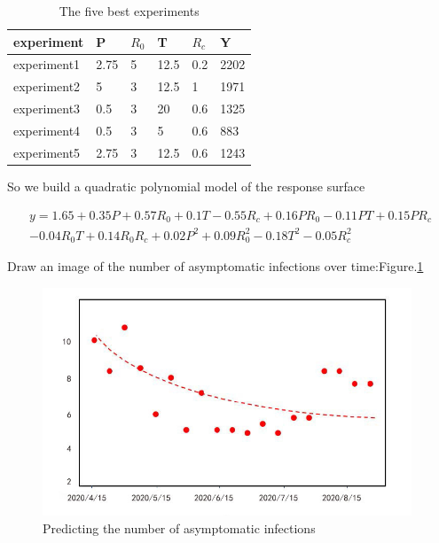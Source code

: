 \documentclass[a4paper, 11pt,twoside=true]{scrartcl}
\begin{document}
\begin{table}[H]
	\centering
	\caption{The five best experiments} \label{P3T8}
	\begin{tabular}{llllll}
		\hline
		\textbf{experiment} & \textbf{P} & \textbf{$R_0$} & \textbf{T} & \textbf{$R_c$} & \textbf{Y} \\ \hline
		experiment1         & 2.75       & 5              & 12.5       & 0.2            & 2202       \\
		experiment2         & 5          & 3              & 12.5       & 1              & 1971       \\
		experiment3         & 0.5        & 3              & 20         & 0.6            & 1325       \\
		experiment4         & 0.5        & 3              & 5          & 0.6            & 883        \\
		experiment5         & 2.75       & 3              & 12.5       & 0.6            & 1243       \\ \hline
	\end{tabular}
\end{table}

\noindent So we build a quadratic polynomial model of the response surface

$$
\begin{aligned}
y=1.65+0.35P+0.57R_0+0.1T-0.55R_c+0.16PR_0-0.11PT+0.15PR_c \\
-0.04R_0T+0.14R_0R_c+0.02P^2+0.09R_0^2-0.18T^2-0.05R_c^2
\end{aligned}
$$

\noindent Draw an image of the number of asymptomatic infections over time:Figure.\ref{res}

\begin{figure}[]
	\small
	\centering
	\includegraphics[width=11cm]{res}
	\caption{Predicting the number of asymptomatic infections} \label{res}
\end{figure}
\end{document}
